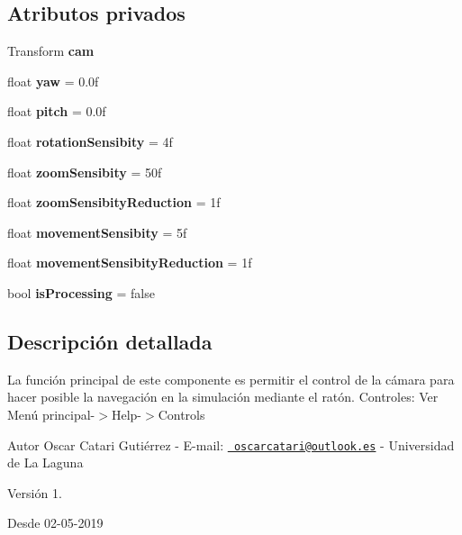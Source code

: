 \subsection*{Atributos privados}
\begin{DoxyCompactItemize}
\item 
\mbox{\label{class_camera_control_ab1e38892e7de2594973a2689efe7d953}} 
Transform {\bfseries cam}
\item 
\mbox{\label{class_camera_control_aac049ab806525d07e5d8d6e58a319dfb}} 
float {\bfseries yaw} = 0.\+0f
\item 
\mbox{\label{class_camera_control_a2f6c91fee43b7225b4db9ac6ee2a5803}} 
float {\bfseries pitch} = 0.\+0f
\item 
\mbox{\label{class_camera_control_a83ed25c7aa137776336f286aa4ee720f}} 
float {\bfseries rotation\+Sensibity} = 4f
\item 
\mbox{\label{class_camera_control_a224cd9cb5169e365221e065ee024fa4c}} 
float {\bfseries zoom\+Sensibity} = 50f
\item 
\mbox{\label{class_camera_control_ae22afdbb7be97dc34dde89c14454fa49}} 
float {\bfseries zoom\+Sensibity\+Reduction} = 1f
\item 
\mbox{\label{class_camera_control_a01ac418e6b400af0cc99fa296cd11f65}} 
float {\bfseries movement\+Sensibity} = 5f
\item 
\mbox{\label{class_camera_control_aff6a3ff375bdfb784b890c1d3b88744e}} 
float {\bfseries movement\+Sensibity\+Reduction} = 1f
\item 
\mbox{\label{class_camera_control_aee9c2756bb3068ab9ddade8811ccf4fe}} 
bool {\bfseries is\+Processing} = false
\end{DoxyCompactItemize}


\subsection{Descripción detallada}
La función principal de este componente es permitir el control de la cámara para hacer posible la navegación en la simulación mediante el ratón. Controles\+: Ver Menú principal-\/$>$Help-\/$>$Controls \begin{DoxyAuthor}{Autor}
Oscar Catari Gutiérrez -\/ E-\/mail\+: \href{mailto:oscarcatari@outlook.es}{\texttt{ oscarcatari@outlook.\+es}} -\/ Universidad de La Laguna 
\end{DoxyAuthor}
\begin{DoxyVersion}{Versión}
1. 
\end{DoxyVersion}
\begin{DoxySince}{Desde}
02-\/05-\/2019 
\end{DoxySince}


